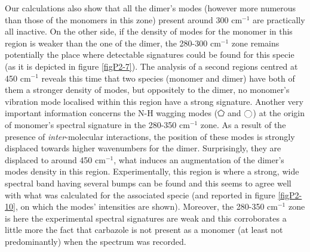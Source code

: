	
	Our calculations also show that all the dimer’s modes (however more numerous than those of the monomers in this zone) present around 300 cm$^{-1}$ are practically all inactive. On the other side, if the density of modes for the monomer in this region is weaker than the one of the dimer, the 280-300 cm$^{-1}$ zone remains potentially the place where detectable signatures could be found for this specie (as it is depicted in figure \ref{figP2-7}). The analysis of a second regions centred at 450 cm$^{-1}$ reveals this time that two species (monomer and dimer) have both of them a stronger density of modes, but oppositely to the dimer, no monomer’s vibration mode localised within this region have a strong signature. Another very important information concerns the N-H wagging modes ($\pentagon$ and $\octagon$)
	  at the origin of monomer’s spectral signature in the 280-350 cm$^{-1}$ zone. As a result of the presence of \textit{inter}-molecular interactions, the position of these modes is strongly displaced towards higher wavenumbers for the dimer. Surprisingly, they are displaced to around 450 cm$^{-1}$, what induces an augmentation of the dimer’s modes density in this region. Experimentally, this region is where a strong, wide spectral band having several bumps can be found and this seems to agree well with what was calculated for the associated specie (and reported in figure \ref{figP2-10}, on which the modes’ intensities are shown). Moreover, the 280-350 cm$^{-1}$ zone is here the experimental spectral signatures are weak and this corroborates a little more the fact that carbazole is not present as a monomer (at least not predominantly)  when the spectrum was recorded.
	 
